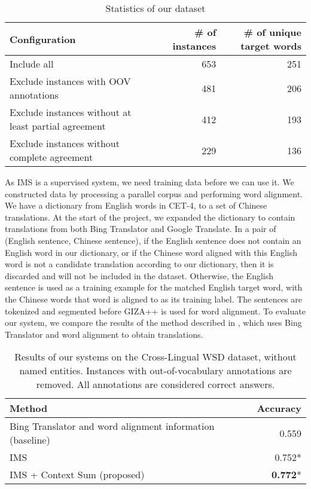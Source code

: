 \documentclass[11pt]{article}
\begin{document}
\begin{table}[ht]
	\caption{Statistics of our dataset}
	\label{table:CLWSD-test-stats-no-ne}
	\begin{center}
		\begin{tabular}{| p{8cm} | r| r|}
			\hline
			Configuration & \# of instances & \# of unique target words \\
			\hline
			Include all & 653 & 251\\ 
			\hline
			Exclude instances with OOV annotations & 481 & 206 \\						
			\hline
			Exclude instances without at least partial agreement & 412 & 193 \\
			\hline
			Exclude instances without complete agreement & 229 & 136 \\
			\hline
		\end{tabular}
	\end{center}
\end{table}

As IMS is a supervised system, we need  training data before we can use it. We constructed data by processing a parallel corpus and performing word alignment. We have a dictionary from English words in CET-4, to a set of Chinese translations. At the start of the project, we expanded the dictionary to contain translations from both Bing Translator and Google Translate. In a pair of (English sentence, Chinese sentence), if the English sentence does not contain an English word in our dictionary, or if the Chinese word aligned with this English word is not a candidate translation according to our dictionary, then it is discarded and will not be included in the dataset. Otherwise, the English sentence is used as a training example for the matched English target word, with the Chinese words that word is aligned to as its training label. The sentences are tokenized and segmented before GIZA++ \cite {och03} is used for word alignment. To evaluate our system, we compare the results of the method described in \cite{tao2014}, which uses Bing Translator and word alignment to obtain translations.


\begin{table}[ht]
	\caption{Results of our systems on the Cross-Lingual WSD dataset, without named entities. Instances with out-of-vocabulary annotations are removed. All annotations are considered correct answers.}
	\label{table:CLWSD-test-results}
	\begin{center}

			\begin{tabular}{| p{9cm}| r| }
				\hline
				Method & Accuracy \\
				\hline
				Bing Translator and 
                word alignment information (baseline) & 0.559  \\
				\hline
				IMS & 0.752*  \\
				\hline
				IMS + Context Sum (proposed) & {\bf 0.772}*  \\
				\hline
			\end{tabular}

	\end{center}
\end{table}
\end{document}
